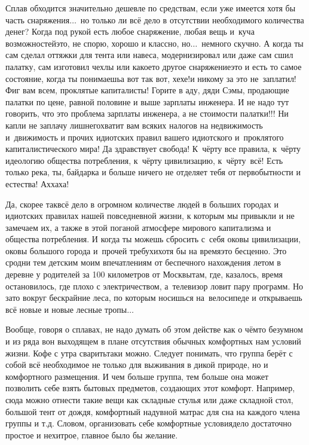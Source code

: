 Сплав обходится значительно дешевле по средствам, если уже имеется хотя бы часть снаряжения$\ldots$~но только ли всё дело в отсутствии необходимого количества денег? Когда под рукой есть любое снаряжение, любая вещь и~куча возможностей\mdash это, не спорю, хорошо и классно, но$\ldots$~немного скучно. А когда ты сам сделал оттяжки для тента или навеса, модернизировал или даже сам сшил палатку, сам изготовил чехлы или какое\sdash то другое снаряжение\mdash это и есть то самое состояние, когда ты понимаешь\mdash а вот так вот, хе\sdash хе!\mdash и никому за это не~заплатил! Фиг вам всем, проклятые капиталисты! Горите в аду, дяди Сэмы, продающие палатки по цене, равной половине и выше зарплаты инженера. И не надо тут говорить, что это проблема зарплаты инженера, а не стоимости палатки!!! Ни капли не заплачу лишнего\mdash хватит вам всяких налогов на недвижимость и~движимость и прочих идиотских правил вашего идиотского и~проклятого капиталистического мира! Да здравствует свобода! К~чёрту все правила, к~чёрту идеологию общества потребления, к~чёрту цивилизацию, к~чёрту~всё! Есть только река, ты, байдарка и больше ничего не отделяет тебя от первобытности и естества! Ах\sdash ха\sdash ха!

Да, скорее так\mdash всё дело в огромном количестве людей в больших городах и идиотских правилах нашей повседневной жизни, к которым мы привыкли и не замечаем их, а также в этой поганой атмосфере мирового капитализма и общества потребления. И когда ты можешь сбросить с~себя оковы цивилизации, оковы большого города и~прочей требухи\mdash хотя бы на время\mdash это бесценно. Это сродни тем детским моим впечатлениям от беспечного нахождения летом в деревне у родителей за 100 километров от Москвы\mdash там, где, казалось, время остановилось, где плохо с электричеством, а~телевизор ловит пару программ. Но зато вокруг бескрайние леса, по которым носишься на~велосипеде и открываешь всё новые и новые лесные тропы$\ldots$ 

Вообще, говоря о сплавах, не надо думать об этом действе как о чём\sdash то безумном и из ряда вон выходящем в плане отсутствия обычных комфортных нам условий жизни. Кофе с утра сварить\sdash таки можно. Следует понимать, что группа берёт с собой всё необходимое не только для выживания в дикой природе, но и комфортного размещения. И чем больше группа, тем больше она может позволить себе взять бытовых предметов, создающих этот комфорт. Например, сюда можно отнести такие вещи как складные стулья или даже складной стол, большой тент от дождя, комфортный надувной матрас для сна на каждого члена группы и т.д. Словом, организовать себе комфортные условия\mdash дело достаточно простое и нехитрое, главное было бы желание. 

